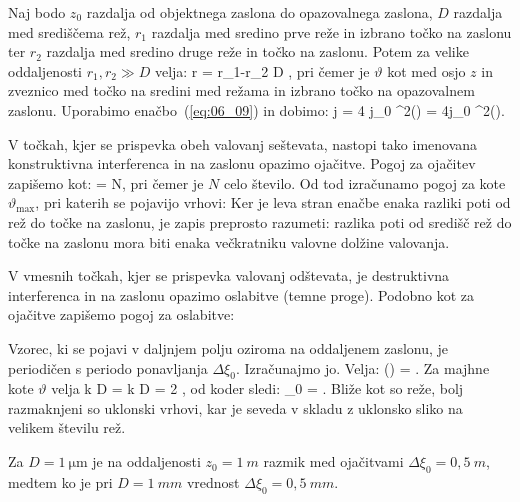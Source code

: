 Naj bodo $z_0$ razdalja od objektnega zaslona do opazovalnega zaslona, $D$ razdalja 
med središčema rež, $r_1$ razdalja med sredino prve reže in izbrano točko na zaslonu
ter $r_2$ razdalja med sredino druge reže in točko na zaslonu. Potem za velike 
oddaljenosti $r_1, r_2 \gg D$ velja:
\beq
\Delta r = r_1-r_2 \approx D \sin\vartheta,
\label{eq:06_16}
\eeq
pri čemer je $\vartheta$ kot med osjo $z$ in zveznico med točko na sredini med režama in
izbrano točko na opazovalnem zaslonu. Uporabimo enačbo~(\ref{eq:06_09}) in dobimo:
\beq
j = 4 j_0 \cos^2\left(\right) = 4j_0 \cos^2\left(\right).
\label{eq:06_17}
\eeq

V točkah, kjer se prispevka obeh valovanj seštevata, nastopi tako imenovana
konstruktivna interferenca in na zaslonu opazimo ojačitve. Pogoj za ojačitev zapišemo kot:
\beq
{} = N\pi,
\label{eq:06_18}
\eeq
pri čemer je $N$ celo število. Od tod izračunamo pogoj za kote $\vartheta_\mathrm{max}$, pri katerih
se pojavijo vrhovi:
Ker je leva stran enačbe enaka razliki poti od rež do točke na zaslonu, je zapis preprosto razumeti:
razlika poti od središč rež do točke na zaslonu mora biti enaka večkratniku valovne dolžine valovanja.

V vmesnih točkah, kjer se prispevka valovanj odštevata, je destruktivna
interferenca in na zaslonu opazimo oslabitve (temne proge). Podobno kot za ojačitve
zapišemo pogoj za oslabitve:

Vzorec, ki se pojavi v daljnjem polju oziroma na oddaljenem zaslonu,
je periodičen s periodo ponavljanja $\Delta \xi_0$. Izračunajmo jo. Velja:
\beq
\Delta \left(\right) = \pi.
\label{eq:06_19}
\eeq
Za majhne kote $\vartheta$ velja 
\beq
k D \Delta \vartheta = k D  = 2 \pi,
\label{eq:06_20}
\eeq
od koder sledi:
\beq
\Delta \xi_0 = .
\label{eq:06_21}
\eeq
Bliže kot so reže, bolj razmaknjeni so uklonski vrhovi, kar je seveda v skladu
z uklonsko sliko na velikem številu rež. 

Za $D=1~\si{\micro\metre}$ je na oddaljenosti $z_0 = 1~\si{m}$ razmik med ojačitvami
$\Delta \xi_0 = 0,5~\si{m}$, medtem ko je pri $D = 1~\si{mm}$ 
vrednost $\Delta \xi_0 = 0,5~\si{mm}$. 

